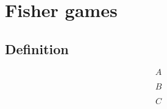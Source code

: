 \documentclass{beamer}
\begin{document}
\begin{frame}{}

\end{frame}

\section{Fisher games}
\subsection{Definition}
\begin{frame}{}

\end{frame}


\begin{frame}{}


\end{frame}




\begin{frame}{}

\begin{equation}
    A
\end{equation}

\pause

\begin{equation}
    B
\end{equation}

\pause

\begin{equation}
    C
\end{equation}

\end{frame}

\begin{frame}{}

\end{frame}

\begin{frame}{}

\end{frame}

\begin{frame}{}

\end{frame}

\begin{frame}{}

\end{frame}

\begin{frame}{}

\end{frame}
\end{document}
